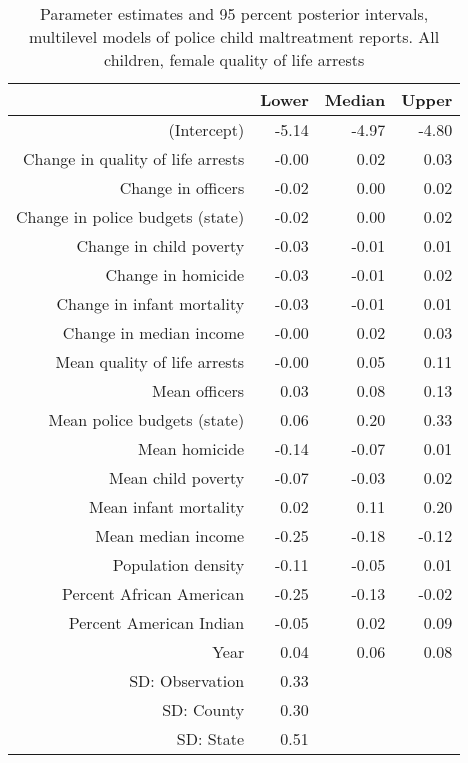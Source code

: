 \begin{table}[ht]
\centering
\begin{tabular}{rrrr}
  \hline
 & Lower & Median & Upper \\ 
  \hline
(Intercept) & -5.14 & -4.97 & -4.80 \\ 
  Change in quality of life arrests & -0.00 & 0.02 & 0.03 \\ 
  Change in officers & -0.02 & 0.00 & 0.02 \\ 
  Change in police budgets (state) & -0.02 & 0.00 & 0.02 \\ 
  Change in child poverty & -0.03 & -0.01 & 0.01 \\ 
  Change in homicide & -0.03 & -0.01 & 0.02 \\ 
  Change in infant mortality & -0.03 & -0.01 & 0.01 \\ 
  Change in median income & -0.00 & 0.02 & 0.03 \\ 
  Mean quality of life arrests & -0.00 & 0.05 & 0.11 \\ 
  Mean officers & 0.03 & 0.08 & 0.13 \\ 
  Mean police budgets (state) & 0.06 & 0.20 & 0.33 \\ 
  Mean homicide & -0.14 & -0.07 & 0.01 \\ 
  Mean child poverty & -0.07 & -0.03 & 0.02 \\ 
  Mean infant mortality & 0.02 & 0.11 & 0.20 \\ 
  Mean median income & -0.25 & -0.18 & -0.12 \\ 
  Population density & -0.11 & -0.05 & 0.01 \\ 
  Percent African American & -0.25 & -0.13 & -0.02 \\ 
  Percent American Indian & -0.05 & 0.02 & 0.09 \\ 
  Year & 0.04 & 0.06 & 0.08 \\ 
  SD: Observation & 0.33 &  &  \\ 
  SD: County & 0.30 &  &  \\ 
  SD: State & 0.51 &  &  \\ 
   \hline
\end{tabular}
\caption{Parameter estimates and 95 percent posterior intervals, multilevel models of 
             police child maltreatment reports. All children, female quality of life arrests} 
\end{table}
